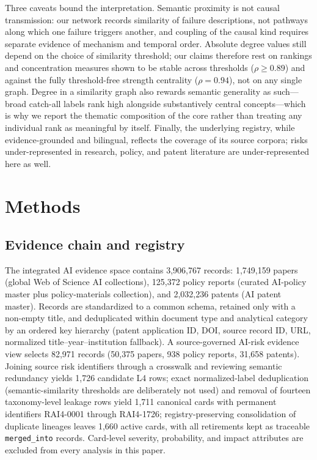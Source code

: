 \documentclass[fleqn,10pt]{wlscirep}
\begin{document}
Three caveats bound the interpretation. Semantic proximity is not causal
transmission: our network records similarity of failure descriptions, not
pathways along which one failure triggers another, and coupling of the
causal kind requires separate evidence of mechanism and temporal
order\cite{helbing2013}. Absolute degree values still depend on the choice
of similarity threshold; our claims therefore rest on rankings and
concentration measures shown to be stable across thresholds ($\rho \geq
0.89$) and against the fully threshold-free strength centrality ($\rho =
0.94$), not on any single graph. Degree in a similarity graph also rewards
semantic generality as such---broad catch-all labels rank high alongside
substantively central concepts---which is why we report the thematic
composition of the core rather than treating any individual rank as
meaningful by itself. Finally, the underlying registry, while
evidence-grounded and bilingual, reflects the coverage of its source
corpora; risks under-represented in research, policy, and patent literature
are under-represented here as well.

\section*{Methods}

\subsection*{Evidence chain and registry}

The integrated AI evidence space contains 3,906,767 records: 1,749,159 papers
(global Web of Science AI collections), 125,372 policy reports (curated
AI-policy master plus policy-materials collection), and 2,032,236 patents
(AI patent master). Records are standardized to a common schema, retained
only with a non-empty title, and deduplicated within document type and
analytical category by an ordered key hierarchy (patent application ID, DOI,
source record ID, URL, normalized title--year--institution fallback). A
source-governed AI-risk evidence view selects 82,971 records (50,375 papers,
938 policy reports, 31,658 patents). Joining source risk identifiers through
a crosswalk and reviewing semantic redundancy yields 1,726 candidate L4
rows; exact normalized-label deduplication (semantic-similarity thresholds
are deliberately not used) and removal of fourteen taxonomy-level leakage
rows yield 1,711 canonical cards with permanent identifiers RAI4-0001 through
RAI4-1726; registry-preserving consolidation of duplicate lineages leaves
1,660 active cards, with all retirements kept as traceable
\texttt{merged\_into} records. Card-level severity, probability, and impact
attributes are excluded from every analysis in this paper.
\end{document}

